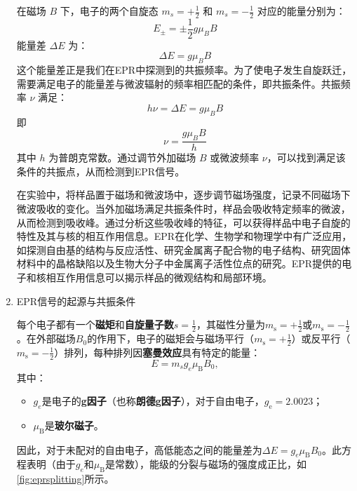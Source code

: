 \documentclass[dvipsnames, svgnames,a4paper,11pt]{article}
\begin{document}
\begin{enumerate}
		在磁场 \( B \) 下，电子的两个自旋态 \( m_s = +\frac{1}{2} \) 和 \( m_s = -\frac{1}{2} \) 对应的能量分别为：\[ E_{\pm} = \pm \frac{1}{2} g \mu_B B \]能量差 \( \Delta E \) 为：\[ \Delta E = g \mu_B B \]这个能量差正是我们在EPR中探测到的共振频率。为了使电子发生自旋跃迁，需要满足电子的能量差与微波辐射的频率相匹配的条件，即共振条件。共振频率 \( \nu \) 满足：\[ h \nu = \Delta E = g \mu_B B \]即\[ \nu = \frac{g \mu_B B}{h} \]其中 \( h \) 为普朗克常数。通过调节外加磁场 \( B \) 或微波频率 \( \nu \)，可以找到满足该条件的共振点，从而检测到EPR信号。
		
		
		在实验中，将样品置于磁场和微波场中，逐步调节磁场强度，记录不同磁场下微波吸收的变化。当外加磁场满足共振条件时，样品会吸收特定频率的微波，从而检测到吸收峰。通过分析这些吸收峰的特征，可以获得样品中电子自旋的特性及其与核的相互作用信息。EPR在化学、生物学和物理学中有广泛应用，如探测自由基的结构与反应活性、研究金属离子配合物的电子结构、研究固体材料中的晶格缺陷以及生物大分子中金属离子活性位点的研究。EPR提供的电子和核相互作用信息可以揭示样品的微观结构和局部环境。
		
		\item EPR信号的起源与共振条件
		
		每个电子都有一个\textbf{磁矩}和\textbf{自旋量子数}$s = \tfrac{1}{2}$，其磁性分量为$m_\mathrm{s} = + \tfrac{1}{2}$或$m_\mathrm{s} = - \tfrac{1}{2}$。在外部磁场$B_0$的作用下，电子的磁矩会与磁场平行（$m_\mathrm{s} = + \tfrac{1}{2}$）或反平行（$m_\mathrm{s} = - \tfrac{1}{2}$）排列，每种排列因\textbf{塞曼效应}具有特定的能量：
		\begin{equation*}
			E = m_s g_e \mu_\text{B} B_0,
		\end{equation*}
		其中：
		\begin{itemize}
			\item $g_e$是电子的\textbf{g因子}（也称\textbf{朗德g因子}），对于自由电子，$g_\mathrm{e} = 2.0023$；
			\item $\mu_\text{B}$是\textbf{玻尔磁子}。
		\end{itemize}
		
		因此，对于未配对的自由电子，高低能态之间的能量差为$\Delta E = g_e \mu_\text{B} B_0$。此方程表明（由于$g_e$和$\mu_\text{B}$是常数），能级的分裂与磁场的强度成正比，如\cref{fig:eprsplitting}所示。
		

\end{enumerate}
\end{document}
